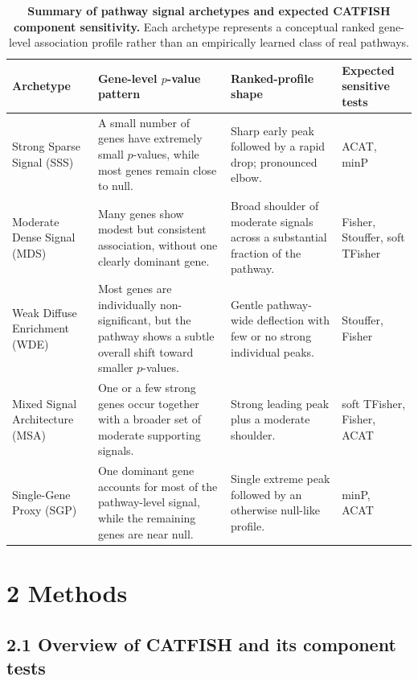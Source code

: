 \documentclass[unnumsec,webpdf,contemporary,large]{oup-authoring-template}%
\theoremstyle{thmstyleone}%
\theoremstyle{thmstyletwo}%
\theoremstyle{thmstylethree}%
\begin{document}
\begin{table}[!t]
\centering
\caption{\textbf{Summary of pathway signal archetypes and expected CATFISH component sensitivity.}
Each archetype represents a conceptual ranked gene-level association profile rather than an empirically learned class of real pathways.}
\label{tab:archetype_summary}
\small
\begin{tabular}{p{} p{} p{} p{}}
\hline
\textbf{Archetype} & \textbf{Gene-level $p$-value pattern} & \textbf{Ranked-profile shape} & \textbf{Expected sensitive tests} \\
\hline

Strong Sparse Signal (SSS) &
A small number of genes have extremely small $p$-values, while most genes remain close to null. &
Sharp early peak followed by a rapid drop; pronounced elbow. &
ACAT, minP \\

Moderate Dense Signal (MDS) &
Many genes show modest but consistent association, without one clearly dominant gene. &
Broad shoulder of moderate signals across a substantial fraction of the pathway. &
Fisher, Stouffer, soft TFisher \\

Weak Diffuse Enrichment (WDE) &
Most genes are individually non-significant, but the pathway shows a subtle overall shift toward smaller $p$-values. &
Gentle pathway-wide deflection with few or no strong individual peaks. &
Stouffer, Fisher \\

Mixed Signal Architecture (MSA) &
One or a few strong genes occur together with a broader set of moderate supporting signals. &
Strong leading peak plus a moderate shoulder. &
soft TFisher, Fisher, ACAT \\

Single-Gene Proxy (SGP) &
One dominant gene accounts for most of the pathway-level signal, while the remaining genes are near null. &
Single extreme peak followed by an otherwise null-like profile. &
minP, ACAT \\

\hline
\end{tabular}
\end{table}


\section{2 Methods}


\subsection{2.1 Overview of CATFISH and its component tests}
\end{document}
